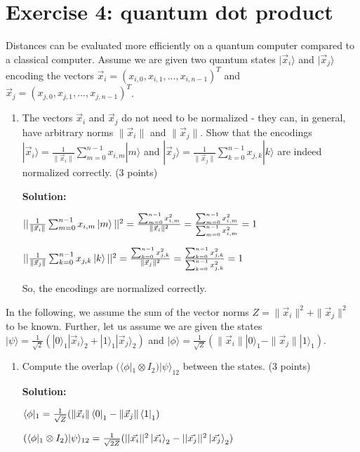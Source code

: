 \documentclass[12pt]{article}
\begin{document}
\section{Exercise 4: quantum dot product}

Distances can be evaluated more efficiently on a quantum computer compared to a classical computer. Assume we are given two quantum states $|\vec{x}_i\rangle$ and $|\vec{x}_j\rangle$ encoding the vectors $\vec{x}_i = (x_{i,0}, x_{i,1}, ..., x_{i,n-1})^T$ and $\vec{x}_j = (x_{j,0}, x_{j,1}, ..., x_{j,n-1})^T$.
\begin{enumerate}
    \item The vectors $\vec{x}_i$ and $\vec{x}_j$ do not need to be normalized - they can, in general, have arbitrary norms $\|\vec{x}_i\|$ and $\|\vec{x}_j\|$. Show that the encodings 
    $|\vec{x}_i\rangle = \frac{1}{\|\vec{x}_i\|} \sum_{m=0}^{n-1} x_{i,m}|m\rangle$ 
    and $|\vec{x}_j\rangle = \frac{1}{\|\vec{x}_j\|} \sum_{k=0}^{n-1} x_{j,k}|k\rangle$ are indeed normalized correctly. (3 points)
    
    \textbf{Solution:}

    $||\frac{1}{\|\vec{x}_i\|} \sum_{m=0}^{n-1} x_{i,m}\ket{m}||^2=
    \frac{\sum_{m=0}^{n-1}x_{i,m}^2}{\|\vec{x}_i\|^2}=
    \frac{\sum_{m=0}^{n-1}x_{i,m}^2}{\sum_{m=0}^{n-1}x_{i,m}^2}=1
    $ 

    $||\frac{1}{\|\vec{x}_j\|} \sum_{k=0}^{n-1} x_{j,k}\ket{k}||^2=
    \frac{\sum_{k=0}^{n-1}x_{j,k}^2}{\|\vec{x}_j\|^2}=
    \frac{\sum_{k=0}^{n-1}x_{j,k}^2}{\sum_{k=0}^{n-1}x_{j,k}^2}=1
    $ 

    So, the encodings are normalized correctly.
\end{enumerate}


In the following, we assume the sum of the vector norms $Z = \|\vec{x}_i\|^2 + \|\vec{x}_j\|^2$ to be known. Further, let us assume we are given the states $|\psi\rangle = \frac{1}{\sqrt{2}}(|0\rangle_1|\vec{x}_i\rangle_2 + |1\rangle_1|\vec{x}_j\rangle_2)$ and $|\phi\rangle = \frac{1}{\sqrt{Z}}(\|\vec{x}_i\||0\rangle_1 - \|\vec{x}_j\||1\rangle_1)$.

\begin{enumerate}[start=2]
    \item Compute the overlap $(\langle\phi|_1 \otimes I_2)|\psi\rangle_{12}$ between the states. (3 points)
    

    \textbf{Solution:}

    $\langle\phi|_1=\frac{1}{\sqrt{Z}}(\|\vec{x}_i\|\bra{0}_1 - \|\vec{x}_j\|\bra{1}_1)$
    
    $(\langle\phi|_1 \otimes I_2)|\psi\rangle_{12}
    \\=\frac{1}{\sqrt{2Z}}(||\vec{x_i}||^2\ket{\vec{x_i}}_2-||\vec{x_j}||^2\ket{\vec{x_j}}_2)
    $

\end{enumerate}
\end{document}
